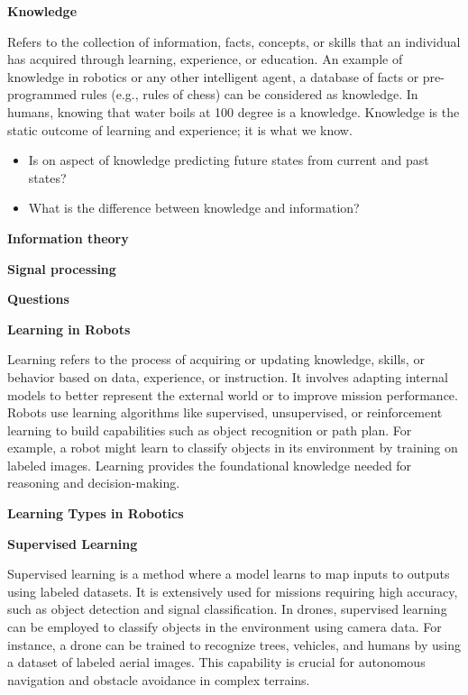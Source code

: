\documentclass{book}
\providecommand{\ProjectDeepHeading}[2]{%
    \par\medskip\noindent\textbf{#2}\par\smallskip
}
\begin{document}
        
        \ProjectDeepHeading{3}{Knowledge}
            Refers to the collection of information, facts, concepts, or skills that an individual has acquired through learning, experience, or education. An example of knowledge in robotics or any other intelligent agent, a database of facts or pre-programmed rules (e.g., rules of chess) can be considered as knowledge. In humans, knowing that water boils at 100 degree is a knowledge. Knowledge is the static outcome of learning and experience; it is what we know.
            \begin{itemize}
                \item Is on aspect of knowledge predicting future states from current and past states?
                \item What is the difference between knowledge and information?
            \end{itemize}
        
        
        \ProjectDeepHeading{3}{Information theory}
        
        
        \ProjectDeepHeading{3}{Signal processing}
        
        
        \ProjectDeepHeading{3}{Questions}


\ProjectDeepHeading{1}{Learning in Robots}
Learning refers to the process of acquiring or updating knowledge, skills, or behavior based on data, experience, or instruction. It involves adapting internal models to better represent the external world or to improve mission performance. Robots use learning algorithms like supervised, unsupervised, or reinforcement learning to build capabilities such as object recognition or path plan. For example, a robot might learn to classify objects in its environment by training on labeled images. Learning provides the foundational knowledge needed for reasoning and decision-making.

\ProjectDeepHeading{2}{Learning Types in Robotics}

\ProjectDeepHeading{3}{Supervised Learning}
Supervised learning is a method where a model learns to map inputs to outputs using labeled datasets. It is extensively used for missions requiring high accuracy, such as object detection and signal classification. In drones, supervised learning can be employed to classify objects in the environment using camera data. For instance, a drone can be trained to recognize trees, vehicles, and humans by using a dataset of labeled aerial images. This capability is crucial for autonomous navigation and obstacle avoidance in complex terrains.
\end{document}
